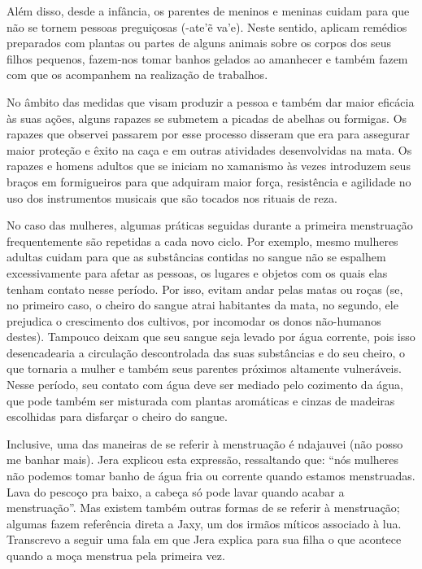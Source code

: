 Além disso, desde a infância, os parentes de meninos e meninas cuidam
para que não se tornem pessoas preguiçosas (-ate’\~{e} va’e). Neste
sentido, aplicam remédios preparados com plantas ou partes de alguns
animais sobre os corpos dos seus filhos pequenos, fazem-nos tomar
banhos gelados ao amanhecer e também fazem com que os acompanhem na
realização de trabalhos.

No âmbito das medidas que visam produzir a pessoa e também dar maior
eficácia às suas ações, alguns rapazes se submetem a picadas de abelhas
ou formigas. Os rapazes que observei passarem por esse processo
disseram que era para assegurar maior proteção e êxito na caça e em
outras atividades desenvolvidas na mata. Os rapazes e homens adultos
que se iniciam no xamanismo às vezes introduzem seus braços em
formigueiros para que adquiram maior força, resistência e agilidade no
uso dos instrumentos musicais que são tocados nos rituais de reza. 

No caso das mulheres, algumas práticas seguidas durante a primeira
menstruação frequentemente são repetidas a cada novo ciclo. Por
exemplo, mesmo mulheres adultas cuidam para que as substâncias contidas
no sangue não se espalhem excessivamente para afetar as pessoas, os
lugares e objetos com os quais elas tenham contato nesse período. Por
isso, evitam andar pelas matas ou roças (se, no primeiro caso, o cheiro
do sangue atrai habitantes da mata, no segundo, ele prejudica o
crescimento dos cultivos, por incomodar os donos não-humanos destes).
Tampouco deixam que seu sangue seja levado por água corrente, pois isso
desencadearia a circulação descontrolada das suas substâncias e do seu
cheiro, o que tornaria a mulher e também seus parentes próximos
altamente vulneráveis. Nesse período, seu contato com água deve ser
mediado pelo cozimento da água, que pode também ser misturada com
plantas aromáticas e cinzas de madeiras escolhidas para disfarçar o
cheiro do sangue.

Inclusive, uma das maneiras de se referir à menstruação é ndajauvei (não
posso me banhar mais). Jera explicou esta expressão, ressaltando que:
``nós mulheres não podemos tomar banho de água fria ou corrente quando
estamos menstruadas. Lava do pescoço pra baixo, a cabeça só pode lavar
quando acabar a menstruação''. Mas existem também outras formas de se
referir à menstruação; algumas fazem referência direta a Jaxy, um dos
irmãos míticos associado à lua. Transcrevo a seguir uma fala em que
Jera explica para sua filha o que acontece quando a moça menstrua pela
primeira vez. 

